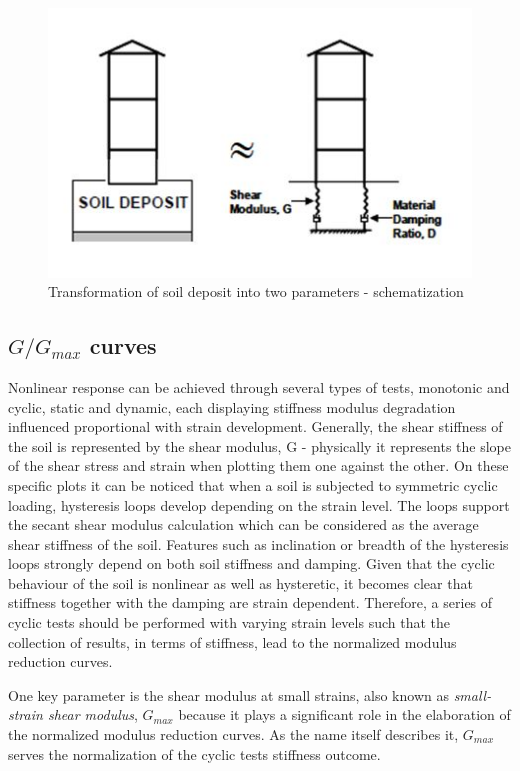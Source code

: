 \documentclass[10pt,a4paper]{report}
\begin{document}
\begin{figure}[h!]
	\centering
	\includegraphics[width=0.8\linewidth]{"soildeposit"}
	\caption{Transformation of soil deposit into two parameters - schematization}
	\label{scheme2}
\end{figure}

\subsection{${G/G_{max}}$ curves}
Nonlinear response can be achieved through several types of tests, monotonic and cyclic, static and dynamic, each displaying stiffness modulus degradation influenced proportional with strain development. Generally, the shear stiffness of the soil is represented by the shear modulus, G - physically it represents the slope of the shear stress and strain when plotting them one against the other. On these specific plots it can be noticed that when a soil is subjected to symmetric cyclic loading, hysteresis loops develop depending on the strain level. The loops support the secant shear modulus calculation which can be considered as the average shear stiffness of the soil. Features such as inclination or breadth of the hysteresis loops strongly depend on both soil stiffness and damping. Given that the cyclic behaviour of the soil is nonlinear as well as hysteretic, it becomes clear that stiffness together with the damping are strain dependent. Therefore, a series of cyclic tests should be performed with varying strain levels such that the collection of results, in terms of stiffness, lead to the normalized modulus reduction curves.

One key parameter is the shear modulus at small strains, also known as \textit{small-strain shear modulus}, $G_{max}$ because it plays a significant role in the elaboration of the normalized modulus reduction curves. As the name itself describes it, $G_{max}$ serves the normalization of the cyclic tests stiffness outcome. 
\end{document}

